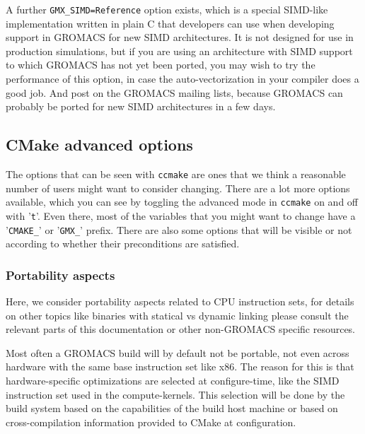 \documentclass{article}[12pt,a4paper,twoside]
\newcommand{\gromacs}{GROMACS}
\newcommand{\cmake}{CMake}
\begin{document}
A further \verb+GMX_SIMD=Reference+ option exists, which is a special
SIMD-like implementation written in plain C that developers can use
when developing support in GROMACS for new SIMD architectures. It is
not designed for use in production simulations, but if you are using
an architecture with SIMD support to which \gromacs{} has not yet been
ported, you may wish to try the performance of this option, in case
the auto-vectorization in your compiler does a good job. And post on
the \gromacs{} mailing lists, because \gromacs{} can probably be
ported for new SIMD architectures in a few days.

\subsection{CMake advanced options}
The options that can be seen with \verb+ccmake+ are ones that we
think a reasonable number of users might want to consider
changing. There are a lot more options available, which you can see by
toggling the advanced mode in \verb+ccmake+ on and off with
'\verb+t+'. Even there, most of the variables that you might want to
change have a '\verb+CMAKE_+' or '\verb+GMX_+' prefix. There are also
some options that will be visible or not according to whether
their preconditions are satisfied.

\subsubsection{Portability aspects}
Here, we consider portability aspects related to CPU instruction sets,
for details on other topics like binaries with statical vs dynamic linking
please consult the relevant parts of this documentation or other non-\gromacs{} specific
resources.

Most often a \gromacs{} build will by default not be portable,
not even across hardware with the same base instruction set like x86.
The reason for this is that hardware-specific optimizations are selected
at configure-time, like the SIMD instruction set used in the compute-kernels.
This selection will be done by the build system based on the capabilities
of the build host machine or based on cross-compilation information provided
to \cmake{} at configuration.
\end{document}
